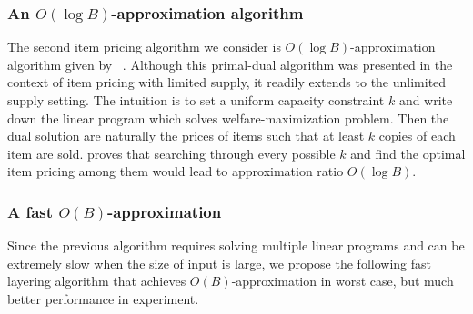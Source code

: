 \subsubsection{An $O(\log B)$-approximation algorithm}

The second item pricing algorithm we consider is $O(\log B)$-approximation algorithm given by ~\cite{cheung2008approximation}. Although this primal-dual algorithm was presented in the context of item pricing with limited supply, it readily extends to the unlimited supply setting. The intuition is to set a uniform capacity constraint $k$ and write down the linear program which solves welfare-maximization problem. Then the dual solution are naturally the prices of items such that at least $k$ copies of each item are sold. \cite{cheung2008approximation} proves that
searching through every possible $k$ and find the optimal item pricing among them would lead to approximation ratio $O(\log B)$.

%		
%		

\subsubsection{A fast $O(B)$-approximation}

Since the previous algorithm requires solving multiple linear programs and can be extremely slow when the size of input is large, we
propose the following fast layering algorithm that achieves $O(B)$-approximation in worst case, but much better performance in experiment.

